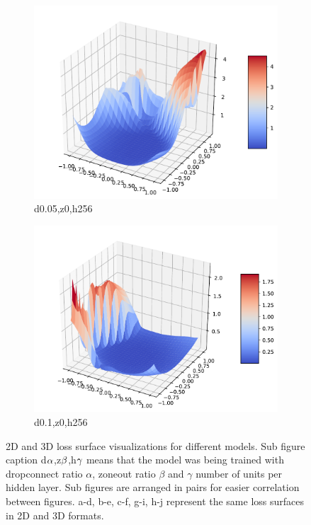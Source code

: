 \documentclass{article}
\begin{document}
\begin{figure}
    \begin{subfigure}[b]{0.3\textwidth}
        \centering
		\includegraphics[width=\textwidth]{report_images/d0.05_z0_h256_3D.pdf}
		\caption{d0.05,z0,h256}
    \end{subfigure}
    \begin{subfigure}[b]{0.3\textwidth}
        \centering
		\includegraphics[width=\textwidth]{report_images/d0.1_z0_h256_3D.pdf}
		\caption{d0.1,z0,h256}
    \end{subfigure}
    \caption{2D and 3D loss surface visualizations for different models. Sub figure caption d$\bf{\alpha}$,z$\bf{\beta}$,h$\bf{\gamma}$ means that the model was being trained with dropconnect ratio $\alpha$, zoneout ratio $\beta$ and $\gamma$ number of units per hidden layer. Sub figures are arranged in pairs for easier correlation between figures. a-d, b-e, c-f, g-i, h-j represent the same loss surfaces in 2D and 3D formats.}
    \label{fig:loss_surface_visualization}
\end{figure}
\end{document}
